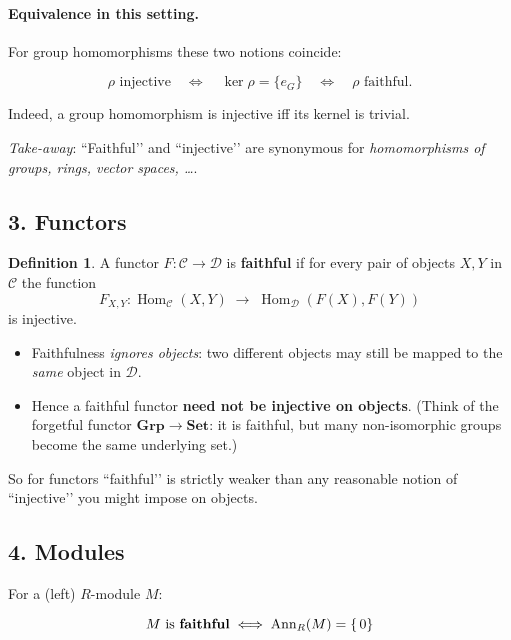 \documentclass[12pt]{article}
\theoremstyle{definition} %
\newtheorem{definition}{Definition}
\theoremstyle{plain} %
\begin{document}
\paragraph{Equivalence in this setting.}
For group homomorphisms these two notions coincide:

\[
   \rho \text{ injective}
   \quad\Longleftrightarrow\quad
   \ker\rho=\{e_G\}
   \quad\Longleftrightarrow\quad
   \rho \text{ faithful}.
\]

Indeed, a group homomorphism is injective
iff its kernel is trivial.  

\emph{Take-away}:  
“Faithful’’ and “injective’’ are synonymous for \emph{homomorphisms of
groups, rings, vector spaces, \dots}.  

\subsection*{3.  Functors}

\begin{definition}
   A functor \(F\colon \mathcal{C}\to\mathcal{D}\) is
   \textbf{faithful} if for every pair of objects \(X,Y\) in
   \(\mathcal{C}\) the function
   \[
      F_{X,Y}\colon \operatorname{Hom}_{\mathcal{C}}(X,Y)
         \;\longrightarrow\;
         \operatorname{Hom}_{\mathcal{D}}(F(X),F(Y))
   \]
   is injective.
\end{definition}

\begin{itemize}
   \item Faithfulness \emph{ignores objects}:  
         two different objects may still be mapped to the \emph{same}
         object in \(\mathcal{D}\).
   \item Hence a faithful functor \textbf{need not be injective on
         objects}.  (Think of the forgetful functor
         \(\mathbf{Grp}\to\mathbf{Set}\): it is faithful, but many
         non-isomorphic groups become the same underlying set.)
\end{itemize}

So for functors “faithful’’ is strictly weaker than any reasonable
notion of “injective’’ you might impose on objects.

\subsection*{4.  Modules}

For a (left) \(R\)-module \(M\):

\[
   M \text{ is \textbf{faithful}}
   \;\Longleftrightarrow\;
   \operatorname{Ann}_R(M)=\{\,0\}
\]
\end{document}
